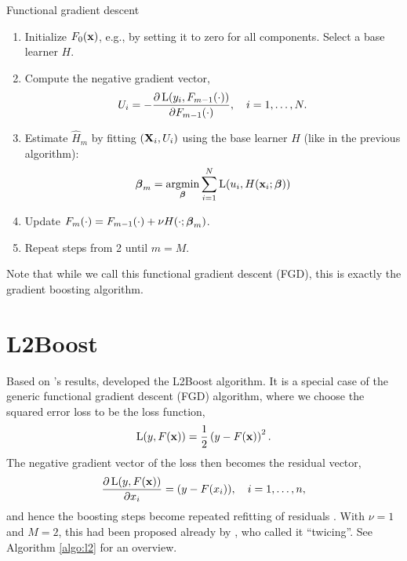 \begin{algorithm}
\caption{Functional gradient descent}
\label{algo:fgd}
\begin{enumerate}
    \item Initialize $F_0(\mathbf{x})$, e.g., by setting it to zero for all components. Select a base learner $H$.
    \item Compute the negative gradient vector,
        \begin{equation*}
            U_i=-\frac{\partial \operatorname{L}(y_i,F_{m-1}(\cdot))}{\partial F_{m-1}(\cdot)},\quad i=1,\dotsc,N.
        \end{equation*}
    \item Estimate $\hat{H}_m$ by fitting $(\mathbf{X}_i,U_i)$ using the base learner $H$ (like in the previous algorithm):
        \begin{equation*}
            \boldsymbol{\beta}_m=\operatorname*{argmin}_{\boldsymbol{\beta}}\sum_{i=1}^N\operatorname{L}(u_i,H(\mathbf{x}_i;\boldsymbol{\beta}))
        \end{equation*}
    \item Update $F_m(\cdot)=F_{m-1}(\cdot)+\nu H(\cdot;\boldsymbol{\beta}_m)$.
    \item Repeat steps from 2 until $m=M$.
\end{enumerate}
\end{algorithm}
Note that while we call this functional gradient descent (FGD), this is exactly the gradient boosting algorithm.
\section{L2Boost}
Based on \cite{friedman2001}'s results, \cite{buhlmann-yu} developed the L2Boost algorithm. It is a special case of the generic functional gradient descent (FGD) algorithm, where we choose the squared error loss to be the loss function,
\begin{equation*}
    \operatorname{L}(y,F(\mathbf{x}))=\frac{1}{2}\left(y-F(\mathbf{x})\right)^2.
\end{equation*}
The negative gradient vector of the loss then becomes the residual vector,
\begin{equation*}
    \frac{\partial\operatorname{L}(y,F(\mathbf{x}))}{\partial x_i}=(y-F(x_i)),\quad i=1,\dotsc,n,
\end{equation*}
and hence the boosting steps become repeated refitting of residuals \citep{friedman2001,buhlmann-yu}. With $\nu=1$ and $M=2$, this had been proposed already by \citep{tukey}, who called it ``twicing''. See Algorithm \ref{algo:l2} for an overview.

